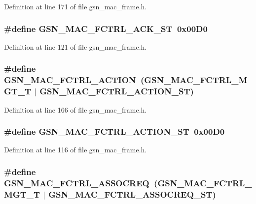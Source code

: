 Definition at line 171 of file gsn\_\-mac\_\-frame.h.

\hypertarget{a00523_a4626cd7bd8a42a2e7eb53ae7175108af}{
\subsubsection[{GSN\_\-MAC\_\-FCTRL\_\-ACK\_\-ST}]{\setlength{\rightskip}{0pt plus 5cm}\#define GSN\_\-MAC\_\-FCTRL\_\-ACK\_\-ST~0x00D0}}
\label{a00523_a4626cd7bd8a42a2e7eb53ae7175108af}


Definition at line 121 of file gsn\_\-mac\_\-frame.h.

\hypertarget{a00523_a9df1a14fcd52f64a68a10dda41a06884}{
\subsubsection[{GSN\_\-MAC\_\-FCTRL\_\-ACTION}]{\setlength{\rightskip}{0pt plus 5cm}\#define GSN\_\-MAC\_\-FCTRL\_\-ACTION~(GSN\_\-MAC\_\-FCTRL\_\-MGT\_\-T     $|$ GSN\_\-MAC\_\-FCTRL\_\-ACTION\_\-ST)}}
\label{a00523_a9df1a14fcd52f64a68a10dda41a06884}


Definition at line 166 of file gsn\_\-mac\_\-frame.h.

\hypertarget{a00523_ac9cd37e66f3584a23910fab2e4a74227}{
\subsubsection[{GSN\_\-MAC\_\-FCTRL\_\-ACTION\_\-ST}]{\setlength{\rightskip}{0pt plus 5cm}\#define GSN\_\-MAC\_\-FCTRL\_\-ACTION\_\-ST~0x00D0}}
\label{a00523_ac9cd37e66f3584a23910fab2e4a74227}


Definition at line 116 of file gsn\_\-mac\_\-frame.h.

\hypertarget{a00523_acd990fd07190c6f3eb0e58dd935fd5df}{
\subsubsection[{GSN\_\-MAC\_\-FCTRL\_\-ASSOCREQ}]{\setlength{\rightskip}{0pt plus 5cm}\#define GSN\_\-MAC\_\-FCTRL\_\-ASSOCREQ~(GSN\_\-MAC\_\-FCTRL\_\-MGT\_\-T     $|$ GSN\_\-MAC\_\-FCTRL\_\-ASSOCREQ\_\-ST)}}
\label{a00523_acd990fd07190c6f3eb0e58dd935fd5df}


